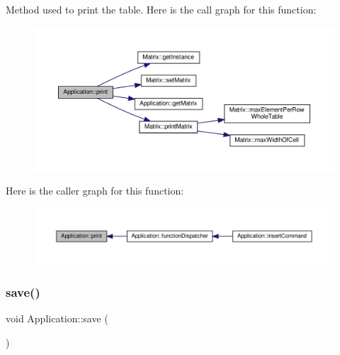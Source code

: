 Method used to print the table. Here is the call graph for this function\+:
\nopagebreak
\begin{figure}[H]
\begin{center}
\leavevmode
\includegraphics[width=350pt]{class_application_a2bc1937440cb9e71dace95c3fe7ed4ea_cgraph}
\end{center}
\end{figure}
Here is the caller graph for this function\+:
\nopagebreak
\begin{figure}[H]
\begin{center}
\leavevmode
\includegraphics[width=350pt]{class_application_a2bc1937440cb9e71dace95c3fe7ed4ea_icgraph}
\end{center}
\end{figure}
\mbox{\label{class_application_a2cbf94e01d55a814de35f90f4d874647}} 
\subsubsection{\texorpdfstring{save()}{save()}}
{\footnotesize\ttfamily void Application\+::save (\begin{DoxyParamCaption}{ }\end{DoxyParamCaption})\hspace{0.3cm}{\ttfamily [private]}}

